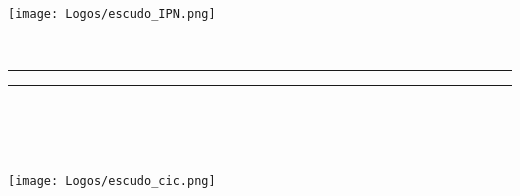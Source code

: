 \begin{titlepage}
        \thispagestyle{empty}
        \begin{minipage}[c][0.17\textheight][c]{0.25\textwidth}
            \begin{center}
                \texttt{[image: Logos/escudo\_IPN.png]}
            \end{center}
        \end{minipage}
        \begin{minipage}[c][0.195\textheight][t]{0.75\textwidth}
            \begin{center}
                \vspace{0.3cm}
                \textsc{\large \univname}\\[0.5cm]
                \vspace{0.3cm}
                \hrule height2.5pt
                \vspace{.2cm}
                \hrule height1pt
                \vspace{.8cm}
                \textsc{\deptname\\
                    \groupname }\\[0.5cm] %
            \end{center}
        \end{minipage}

        \begin{minipage}[c][0.81\textheight][t]{0.25\textwidth}
            \vspace*{5mm}
            \begin{center}
                \hskip2.0mm
                \vrule width1pt height13cm 
                \vspace{5mm}
                \hskip2pt
                \vrule width2.5pt height13cm
                \hskip2mm
                \vrule width1pt height13cm \\
                \vspace{5mm}
                \texttt{[image: Logos/escudo\_cic.png]}
            \end{center}
        \end{minipage}
        \begin{minipage}[c][0.81\textheight][t]{0.75\textwidth}
            \begin{center}
                \vspace{1cm}

                {\large\scshape \ttitle}\\[.2in]


\end{center}
\end{minipage}
\end{titlepage}
